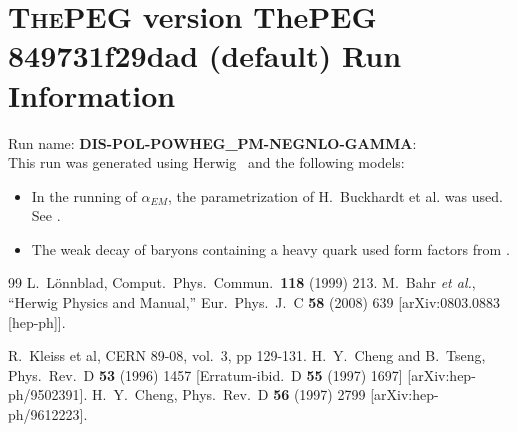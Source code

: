 \documentclass{article}
\begin{document}
\appendix
\section[xxx]{\textsc{ThePEG} version ThePEG 849731f29dad (default) \cite{ThePEG} Run Information}
Run name: \textbf{DIS-POL-POWHEG_PM-NEGNLO-GAMMA}:\\
This run was generated using Herwig~\cite{Bahr:2008pv} and the following models:
\begin{itemize}
\item In the running of $\alpha_{EM}$, the parametrization of H.~Buckhardt et al. was used. See \cite{KLEISSCERN9808v3pp129}.
\item The weak decay of baryons containing a heavy quark used form factors from \cite{Cheng:1995fe,Cheng:1996cs}.
\end{itemize}

\begin{thebibliography}{99}
 L.~L\"onnblad, Comput.~Phys.~Commun.\ {\bf 118} (1999) 213.
  M.~Bahr {\it et al.},
  ``Herwig Physics and Manual,''
  Eur.\ Phys.\ J.\  C {\bf 58} (2008) 639
  [arXiv:0803.0883 [hep-ph]].

 R.~Kleiss et al, CERN 89-08, vol.~3, pp 129-131.
  H.~Y.~Cheng and B.~Tseng,
  Phys.\ Rev.\  D {\bf 53} (1996) 1457
  [Erratum-ibid.\  D {\bf 55} (1997) 1697]
  [arXiv:hep-ph/9502391].
  H.~Y.~Cheng,
  Phys.\ Rev.\  D {\bf 56} (1997) 2799
  [arXiv:hep-ph/9612223].

\end{thebibliography}
\end{document}

